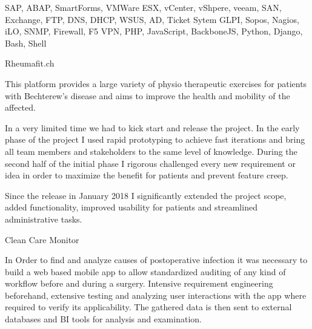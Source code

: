 \documentclass[9pt,a4paper]{altacv}
\begin{document}
SAP, ABAP, SmartForms,
VMWare ESX, vCenter, vShpere, veeam, SAN,
Exchange, FTP, DNS, DHCP, WSUS, AD, Ticket Sytem GLPI,
Sopos, Nagios, iLO, SNMP, Firewall, F5 VPN,
PHP, JavaScript, BackboneJS, Python, Django, Bash, Shell



%
\makebox[0pt][l]{%
  \hspace{-5cm}
  \raisebox{-\totalheight}[0pt][0pt]{%
   {\color{background}\fontsize{250}{48}\faHeart}
}}%
{\color{emphasis}Rheumafit.ch\par}
\smallskip
{\small{}}%
{\small{}}\par
\smallskip

This platform provides a large variety of physio therapeutic exercises for patients with Bechterew's disease
and aims to improve the health and mobility of the affected.
\smallskip

In a very limited time we had to kick start and release the project. In the early phase of the project I used
rapid prototyping to achieve fast iterations and bring all team members and stakeholders to the same level of knowledge.
During the second half of the initial phase I rigorous challenged every new requirement or idea in order to maximize
the benefit for patients and prevent feature creep.
\smallskip

Since the release in January 2018 I significantly extended the project scope, added functionality, improved usability for patients and streamlined
administrative tasks.

\divider


{\color{emphasis}Clean Care Monitor\par}
\smallskip
{\small{}}%
{\small{}}\par
\smallskip

In Order to find and analyze causes of postoperative infection it was necessary to
build a web based mobile app to allow standardized auditing of any kind of workflow
before and during a surgery. Intensive requirement engineering beforehand,
extensive testing and analyzing user interactions with the app where required
to verify its applicability. The gathered data is then sent to external databases and BI tools for analysis and examination.
\end{document}
